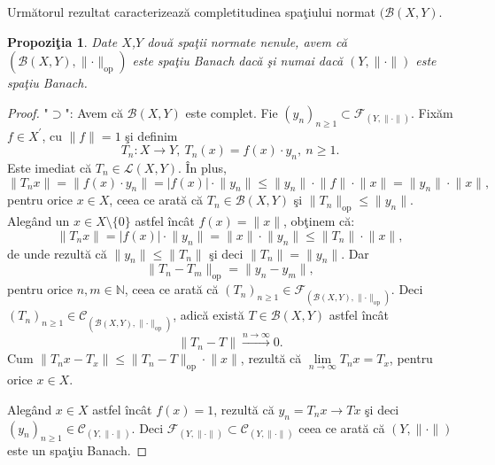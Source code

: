 \documentclass[ a4paper, 12pt]{report}
\newtheorem{prop}[theorem]{\bf Propozi\c tia }
\theoremstyle{definition}
\theoremstyle{remark}
\numberwithin{equation}{section}
\begin{document}
Urm\u atorul rezultat caracterizeaz\u a completitudinea spa\c tiului normat  $(\mathcal{B}(X,Y)$.

\begin{prop}
Date $X$,$Y$ dou\u a spa\c tii normate nenule, avem c\u a $(\mathcal{B}(X,Y), \lVert \cdot \rVert_{\mbox{op}}) $ este spa\c tiu Banach dac\u a \c si numai dac\u a $(Y, \lVert \cdot \rVert)$ este spa\c tiu Banach.
\end{prop}

\begin{proof}
"$\supset$": Avem c\u a $\mathcal{B}(X,Y)$ este complet. Fie $(y_n)_{n \geq 1} \subset \mathcal{F}_{(Y,\lVert \cdot \rVert)}.$
Fix\u am $f \in X^{'}$, cu $\lVert f \rVert = 1$ \c si definim
\[ T_n : X \rightarrow Y,\  T_n(x) = f(x) \cdot y_n,\  n \geq 1.\]
Este imediat c\u a $T_n \in \mathcal{L}(X,Y).$ \^In plus,
$$\lVert T_n x \rVert = \lVert f(x) \cdot y_n  \rVert = \lvert f(x) \rvert \cdot \lVert y_n \rVert \leq \lVert y_n \rVert \cdot \lVert f \rVert \cdot \lVert x \rVert = \lVert y_n  \rVert \cdot \lVert x \rVert,$$ pentru orice $x \in X$, ceea ce arat\u a c\u a $T_n \in \mathcal{B}(X,Y)$ \c si
 $\lVert T_n \rVert_{\mbox{op}} \leq \lVert y_n \rVert.
 $
Aleg\^and un $x \in X \setminus\{0\}$ astfel \^inc\^at $f(x) = \lVert x \rVert$, ob\c tinem c\u a:
$$\lVert T_n x \rVert = \lvert f(x) \rvert \cdot \lVert y_n \rVert = \lVert x \rVert \cdot \lVert y_n \rVert \leq \lVert T_n  \rVert \cdot \lVert x \rVert,$$ de unde rezult\u a c\u a
$\lVert y_n \rVert \leq \lVert T_n \rVert$ \c si deci $\lVert T_n \rVert = \lVert y_n \rVert$.
Dar
$$\lVert T_n -T_m  \rVert_{\mbox{op}} = \lVert y_n - y_m \rVert,$$ pentru orice $n, m \in \mathbb{N}$, ceea ce arat\u a c\u a $(T_n)_{n \geq 1} \in \mathcal{F}_{\left(\mathcal{B}(X,Y), \lVert \cdot  \rVert_{\mbox{op}}\right)}$. Deci $(T_n)_{n \geq 1} \in \mathcal{C}_{\left( \mathcal{B}(X,Y), \lVert \cdot  \rVert_{\mbox{op}} \right)}$, adic\u a exist\u a $T \in \mathcal{B}(X,Y) $ astfel \^inc\^at $$\lVert T_n - T  \rVert \stackrel{n \rightarrow \infty}{\longrightarrow} 0.$$
Cum $\lVert T_n x - T_x \rVert \leq \lVert T_n - T  \rVert_{\mbox{op}} \cdot \lVert x \rVert$, rezult\u a c\u a $\lim\limits_{n \to \infty} T_n x = T_x$, pentru orice $x \in X$.


Aleg\^and $x \in X$ astfel \^inc\^at $f(x) = 1$, rezult\u a c\u a $y_n = T_n x \longrightarrow Tx$ \c si deci $(y_n)_{n \geq 1} \in \mathcal{C}_{(Y,\lVert \cdot \rVert)}$. Deci $\mathcal{F}_{(Y,\lVert \cdot \rVert)} \subset \mathcal{C}_{(Y,\lVert \cdot \rVert)}$ ceea ce arat\u a c\u a $(Y,\lVert \cdot \rVert)$ este un spa\c tiu Banach.


\end{proof}
\end{document}
